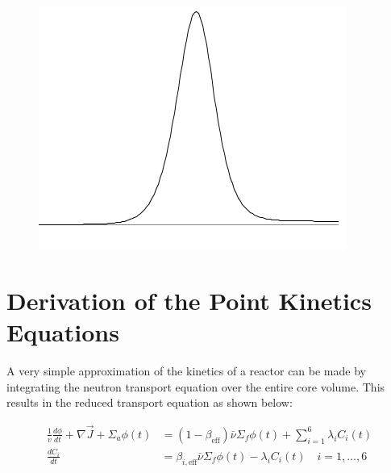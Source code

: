 \documentclass[11pt,letterpaper,titlepage]{article}
\begin{document}
\begin{titlepage}
\begin{center}
\begin{minipage}[c]{0.55\textwidth}
			\begin{figure}[H]
			
				\includegraphics{Logo.png}
			\end{figure}
		\end{minipage}
	\end{center}
	\vspace{2cm}
\end{titlepage}


\pagestyle{fancy}
\cfoot{}
\lfoot{\truncate{14cm}{\NSCDOCTITLE}}
\rhead{}
\chead{\currentname}
\lhead{}
\renewcommand{\footrulewidth}{0.4pt}
\tableofcontents
{}

\listoffigures
\listoftables
{}


\newpage
{}
\section{Derivation of the Point Kinetics Equations}

A very simple approximation of the kinetics of a reactor can be made by integrating the neutron transport equation over the entire core volume. This results in the reduced transport equation as shown below:

\begin{equation}
\begin{aligned}
\frac{1}{v}\frac{d\phi}{dt}+\nabla \vec{J} + \Sigma_a \phi(t) &= (1-\beta_{\mathrm{eff}})\bar{\nu} \Sigma_f \phi (t) + \sum_{i=1}^6 \lambda_i C_i (t) \\
\frac{dC_i}{dt} &= \beta_{i,\mathrm{eff}}\bar{\nu} \Sigma_f \phi (t) - \lambda_i C_i (t) \quad i=1,\dots,6 \\
\end{aligned}
\end{equation}
\end{document}
